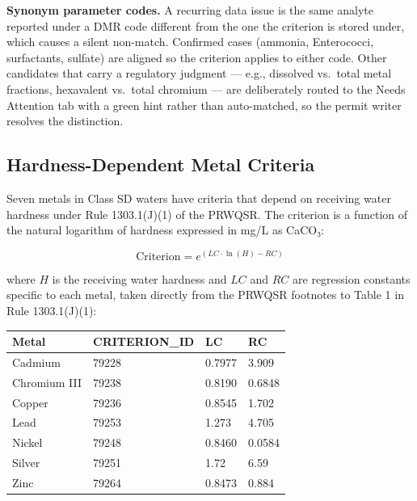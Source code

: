 \documentclass[
  11pt,
  letterpaper,
  DIV=11,
  numbers=noendperiod]{scrartcl}
\newcounter{none} %
\begin{document}
\begin{tcolorbox}[enhanced jigsaw, arc=.35mm, bottomrule=.15mm, bottomtitle=1mm, breakable, colback=white, colbacktitle=quarto-callout-note-color!10!white, colframe=quarto-callout-note-color-frame, coltitle=black, left=2mm, leftrule=.75mm, opacityback=0, opacitybacktitle=0.6, rightrule=.15mm, title=\textcolor{quarto-callout-note-color}{\faInfo}\hspace{0.5em}{Note}, titlerule=0mm, toprule=.15mm, toptitle=1mm]

\textbf{Synonym parameter codes.} A recurring data issue is the same
analyte reported under a DMR code different from the one the criterion
is stored under, which causes a silent non-match. Confirmed cases
(ammonia, Enterococci, surfactants, sulfate) are aligned so the
criterion applies to either code. Other candidates that carry a
regulatory judgment --- e.g., dissolved vs.~total metal fractions,
hexavalent vs.~total chromium --- are deliberately routed to the Needs
Attention tab with a green hint rather than auto-matched, so the permit
writer resolves the distinction.

\end{tcolorbox}

\subsection{Hardness-Dependent Metal Criteria}\label{sec-metals}

Seven metals in Class SD waters have criteria that depend on receiving
water hardness under Rule 1303.1(J)(1) of the PRWQSR. The criterion is a
function of the natural logarithm of hardness expressed in mg/L as
CaCO₃:

\[\text{Criterion} = e^{(LC \cdot \ln(H) - RC)}\]

where \(H\) is the receiving water hardness and \(LC\) and \(RC\) are
regression constants specific to each metal, taken directly from the
PRWQSR footnotes to Table 1 in Rule 1303.1(J)(1):

{\def\LTcaptype{none} %
\begin{longtable}[]{@{}llll@{}}
\toprule\noalign{}
Metal & CRITERION\_ID & LC & RC \\
\midrule\noalign{}
\endhead
\bottomrule\noalign{}
\endlastfoot
Cadmium & 79228 & 0.7977 & 3.909 \\
Chromium III & 79238 & 0.8190 & 0.6848 \\
Copper & 79236 & 0.8545 & 1.702 \\
Lead & 79253 & 1.273 & 4.705 \\
Nickel & 79248 & 0.8460 & 0.0584 \\
Silver & 79251 & 1.72 & 6.59 \\
Zinc & 79264 & 0.8473 & 0.884 \\
\end{longtable}
}
\end{document}
